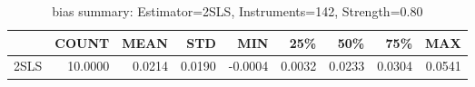 \begin{table}[ht]
\centering
\caption{bias summary: Estimator=2SLS, Instruments=142, Strength=0.80}
\begin{tabular}{lrrrrrrrr}
\toprule
 & COUNT & MEAN & STD & MIN & 25\% & 50\% & 75\% & MAX \\
\midrule
2SLS & 10.0000 & 0.0214 & 0.0190 & -0.0004 & 0.0032 & 0.0233 & 0.0304 & 0.0541 \\
\bottomrule
\end{tabular}
\end{table}
